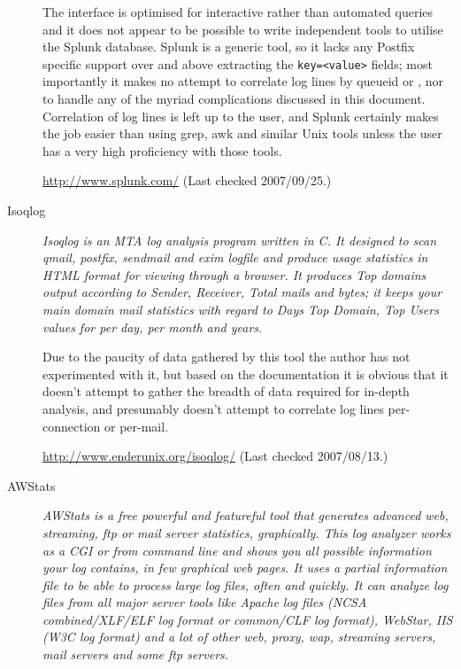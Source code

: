 \documentclass[a4paper,12pt,draft]{article}
\begin{document}
\begin{description}
        The interface is optimised for interactive rather than automated
        queries and it does not appear to be possible to write independent
        tools to utilise the Splunk database.  Splunk is a generic tool, so
        it lacks any Postfix specific support over and above extracting the
        \texttt{key=<value>} fields; most importantly it makes no attempt
        to correlate log lines by queueid or \pid{}, nor to handle any of
        the myriad complications discussed in this document.  Correlation
        of log lines is left up to the user, and Splunk certainly makes the
        job easier than using grep, awk and similar Unix tools unless the
        user has a very high proficiency with those tools.

        \url{http://www.splunk.com/} \newline (Last checked 2007/09/25.)

    \item [Isoqlog] \textit{Isoqlog is an MTA log analysis program written
        in C. It designed to scan qmail, postfix, sendmail and exim logfile
        and produce usage statistics in HTML format for viewing through a
        browser. It produces Top domains output according to Sender,
        Receiver, Total mails and bytes; it keeps your main domain mail
        statistics with regard to Days Top Domain, Top Users values for per
        day, per month and years.\/}

        Due to the paucity of data gathered by this tool the author has not
        experimented with it, but based on the documentation it is obvious
        that it doesn't attempt to gather the breadth of data required for
        in-depth analysis, and presumably doesn't attempt to correlate log
        lines per-connection or per-mail.

        \url{http://www.enderunix.org/isoqlog/} \newline (Last checked
        2007/08/13.)

    \item [AWStats] \textit{AWStats is a free powerful and featureful tool
        that generates advanced web, streaming, ftp or mail server
        statistics, graphically. This log analyzer works as a CGI or from
        command line and shows you all possible information your log
        contains, in few graphical web pages. It uses a partial information
        file to be able to process large log files, often and quickly. It
        can analyze log files from all major server tools like Apache log
        files (NCSA combined/XLF/ELF log format or common/CLF log format),
        WebStar, IIS (W3C log format) and a lot of other web, proxy, wap,
        streaming servers, mail servers and some ftp servers.\/}


\end{description}
\end{document}
